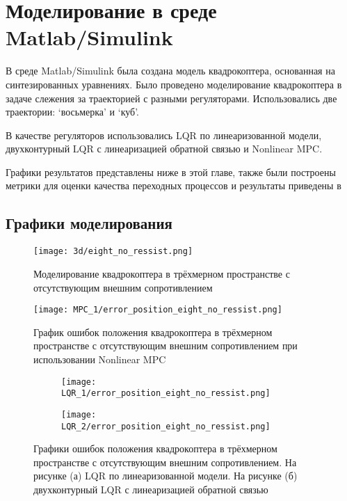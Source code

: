\chapter{Моделирование в среде Matlab/Simulink}
\label{ch:chap3}

В среде Matlab/Simulink была создана модель квадрокоптера,
основанная на синтезированных уравнениях.
Было проведено моделирование квадрокоптера в задаче слежения за траекторией
с разными регуляторами. Использовались две траектории: `восьмерка' и `куб'.

В качестве регуляторов использовались LQR по линеаризованной модели,
двухконтурный LQR с линеаризацией обратной связью и Nonlinear MPC.

Графики результатов представлены ниже в этой главе, также были построены метрики
для оценки качества переходных процессов и результаты приведены в 


\section{Графики моделирования}

\begin{figure}[ht]
    \centering
    \texttt{[image: 3d/eight\_no\_ressist.png]}
    \caption{Моделирование квадрокоптера в трёхмерном пространстве с отсутствующим внешним сопротивлением}
    \label{}
\end{figure}


\begin{figure}[ht]
    \centering
    \texttt{[image: MPC\_1/error\_position\_eight\_no\_ressist.png]}
    \caption{График ошибок положения квадрокоптера в трёхмерном пространстве с отсутствующим внешним сопротивлением при использовании Nonlinear MPC}
    \label{}
\end{figure}

\begin{figure}[ht]
	\centering
\hspace*{\fill}%
	\begin{subfigure}[b]{0.49\textwidth}
        \centering
		\texttt{[image: LQR\_1/error\_position\_eight\_no\_ressist.png]}
		\caption{}
		\label{fig:tiger1}
	\end{subfigure}
\hfill
	\begin{subfigure}[b]{0.49\textwidth}
        \centering
		\texttt{[image: LQR\_2/error\_position\_eight\_no\_ressist.png]}
        \caption{}
		\label{fig:tiger2}
	\end{subfigure}
\hspace*{\fill}%
	\caption{Графики ошибок положения квадрокоптера в трёхмерном пространстве с отсутствующим внешним сопротивлением. На рисунке (а) LQR по линеаризованной модели. На рисунке (б) двухконтурный LQR с линеаризацией обратной связью}
	\label{fig:tiger}
\end{figure}

